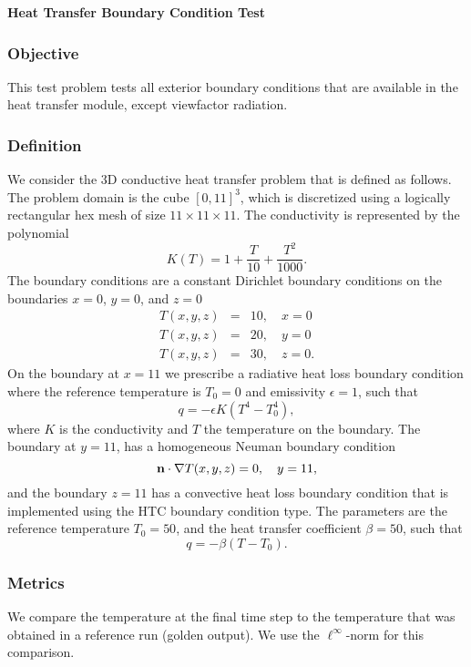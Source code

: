\documentclass[12pt]{article}
\begin{document}
\begin{center}
{\large {\bf Heat Transfer Boundary Condition Test}}
\end{center}

\subsubsection*{Objective}

This test problem tests all exterior boundary conditions that are 
available in the heat transfer module, except viewfactor radiation.


\subsubsection*{Definition}

We consider the 3D conductive heat transfer problem that is defined as
follows. The problem domain is the cube $[0,11]^3$, which is
discretized using a logically rectangular hex mesh of size $11 \times
11 \times 11$. The conductivity is represented by the polynomial
$$
K(T) = 1 + \frac{T}{10} + \frac{T^2}{1000}.
$$
The boundary conditions are a constant Dirichlet boundary conditions
on the boundaries $x=0$, $y=0$, and $z=0$
\begin{eqnarray*}
T(x,y,z) &=& 10,\quad x=0 \\
T(x,y,z) &=& 20,\quad y=0 \\
T(x,y,z) &=& 30,\quad z=0.
\end{eqnarray*} 
On the boundary at $x=11$ we prescribe a radiative heat loss boundary
condition where the reference temperature is $T_0 = 0$ and emissivity
$\epsilon = 1$, such that
$$
q = - \epsilon K (T^4 - T_0^4),
$$ 
where $K$ is the conductivity and $T$ the temperature on the
boundary. 
The boundary at $y=11$, has a homogeneous Neuman boundary condition
$$
{\bf n} \cdot \nabla T (x,y,z) = 0,\quad y=11,
$$
and the boundary $z=11$ has a convective heat loss boundary condition
that is implemented using the HTC boundary condition type. The
parameters are the reference temperature $T_0 = 50$, and the heat
transfer coefficient $\beta = 50$, such that
$$
q = - \beta(T-T_0).
$$






\subsubsection*{Metrics}

We compare the temperature at the final time step to the
temperature that was obtained in a reference run (golden output). We
use the $\ell^\infty$-norm for this comparison. 
\end{document}
